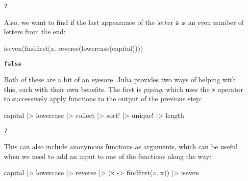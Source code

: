 \documentclass[
  letterpaper,
  DIV=11,
  numbers=noendperiod]{scrreprt}
\newenvironment{Shaded}{\begin{snugshade}}{\end{snugshade}}
\newcommand{\CharTok}[1]{\textcolor[rgb]{0.13,0.47,0.30}{#1}}
\newcommand{\FunctionTok}[1]{\textcolor[rgb]{0.28,0.35,0.67}{#1}}
\newcommand{\NormalTok}[1]{\textcolor[rgb]{0.00,0.23,0.31}{#1}}
\newcommand{\OperatorTok}[1]{\textcolor[rgb]{0.37,0.37,0.37}{#1}}
\begin{document}
\begin{verbatim}
7
\end{verbatim}

Also, we want to find if the last appearance of the letter
\texttt{\textquotesingle{}a\textquotesingle{}} is an even number of
letters from the end:

\begin{Shaded}
\begin{Highlighting}[]
\FunctionTok{iseven}\NormalTok{(}\FunctionTok{findfirst}\NormalTok{(}\CharTok{\textquotesingle{}a\textquotesingle{}}\NormalTok{, }\FunctionTok{reverse}\NormalTok{(}\FunctionTok{lowercase}\NormalTok{(capital))))}
\end{Highlighting}
\end{Shaded}

\begin{verbatim}
false
\end{verbatim}

Both of these are a bit of an eyesore. Julia provides two ways of
helping with this, each with their own benefits. The first is
\emph{piping}, which uses the \texttt{\textbar{}\textgreater{}} operator
to successively apply functions to the output of the previous step:

\begin{Shaded}
\begin{Highlighting}[]
\NormalTok{capital }\OperatorTok{|\textgreater{}}\NormalTok{ lowercase }\OperatorTok{|\textgreater{}}\NormalTok{ collect }\OperatorTok{|\textgreater{}}\NormalTok{ sort! }\OperatorTok{|\textgreater{}}\NormalTok{ unique! }\OperatorTok{|\textgreater{}}\NormalTok{ length}
\end{Highlighting}
\end{Shaded}

\begin{verbatim}
7
\end{verbatim}

This can also include anonymous functions as arguments, which can be
useful when we need to add an input to one of the functions along the
way:

\begin{Shaded}
\begin{Highlighting}[]
\NormalTok{capital }\OperatorTok{|\textgreater{}}\NormalTok{ lowercase }\OperatorTok{|\textgreater{}}\NormalTok{ reverse }\OperatorTok{|\textgreater{}}\NormalTok{ (x }\OperatorTok{{-}\textgreater{}} \FunctionTok{findfirst}\NormalTok{(}\CharTok{\textquotesingle{}a\textquotesingle{}}\NormalTok{, x)) }\OperatorTok{|\textgreater{}}\NormalTok{ iseven}
\end{Highlighting}
\end{Shaded}
\end{document}
